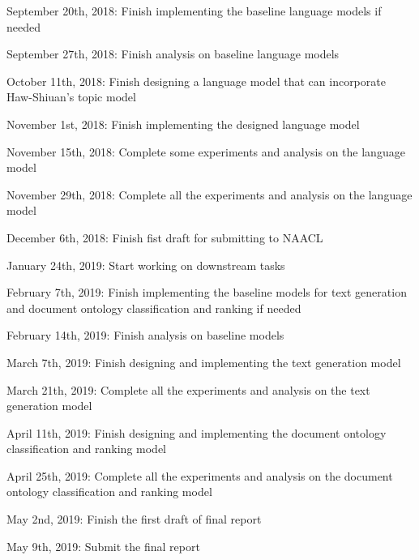 \documentclass[11pt,a4paper]{article}
\begin{document}
September 20th, 2018: Finish implementing the baseline language models if needed

September 27th, 2018: Finish analysis on baseline language models

October 11th, 2018: Finish designing a language model that can incorporate Haw-Shiuan's topic model

November 1st, 2018: Finish implementing the designed language model

November 15th, 2018: Complete some experiments and analysis on the language model

November 29th, 2018: Complete all the experiments and analysis on the language model

December 6th, 2018: Finish fist draft for submitting to NAACL

January 24th, 2019: Start working on downstream tasks

February 7th, 2019: Finish implementing the baseline models for text generation and document ontology classification and ranking if needed

February 14th, 2019: Finish analysis on baseline models

March 7th, 2019: Finish designing and implementing the text generation model

March 21th, 2019: Complete all the experiments and analysis on the text generation model

April 11th, 2019: Finish designing and implementing the document ontology classification and ranking model

April 25th, 2019: Complete all the experiments and analysis on the document ontology classification and ranking model

May 2nd, 2019: Finish the first draft of final report

May 9th, 2019: Submit the final report




\appendix
\end{document}
